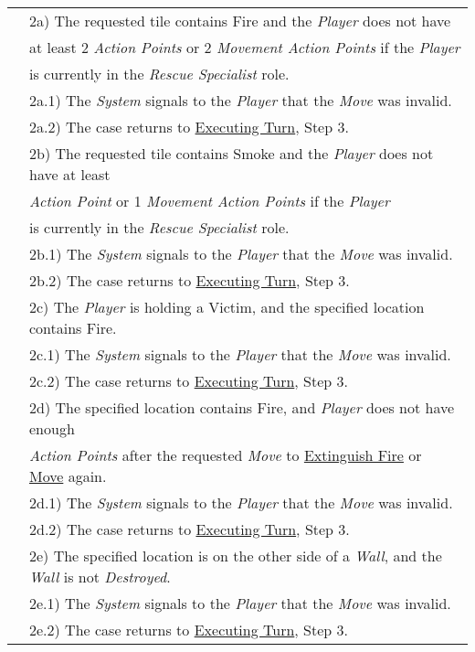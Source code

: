 \documentclass{article}
\begin{document}
	\begin{tabular}{l l}
		&2a) The requested tile contains Fire and the \textit{Player} does not have\\
		&\qquad at least 2 \textit{Action Points} or 2 \textit{Movement Action Points} if the \textit{Player}\\
		&\qquad is currently in the \textit{Rescue Specialist} role.\\
		&\qquad2a.1) The \textit{System} signals to the \textit{Player} that the \textit{Move} was invalid.\\
		&\qquad2a.2) The case returns to \underline{Executing Turn}, Step 3.\\
		&2b) The requested tile contains Smoke and the \textit{Player} does not have at least\\
		&\qquad1 \textit{Action Point} or 1 \textit{Movement Action Points} if the \textit{Player}\\
		&\qquad is currently in the \textit{Rescue Specialist} role.\\
		&\qquad2b.1) The \textit{System} signals to the \textit{Player} that the \textit{Move} was invalid.\\
		&\qquad2b.2) The case returns to \underline{Executing Turn}, Step 3.\\
		&2c) The \textit{Player} is holding a Victim, and the specified location contains Fire.\\
		&\qquad2c.1) The \textit{System} signals to the \textit{Player} that the \textit{Move} was invalid.\\ 
		&\qquad2c.2) The case returns to \underline{Executing Turn}, Step 3.\\
		&2d) The specified location contains Fire, and \textit{Player} does not have enough\\
		&\qquad \textit{Action Points} after the requested \textit{Move} to \underline{Extinguish Fire} or \underline{Move} again.\\
		&\qquad2d.1) The \textit{System} signals to the \textit{Player} that the \textit{Move} was invalid.\\
		&\qquad2d.2) The case returns to \underline{Executing Turn}, Step 3.\\
		&2e) The specified location is on the other side of a \textit{Wall}, and the \textit{Wall} is not \textit{Destroyed}.\\
		&\qquad2e.1) The \textit{System} signals to the \textit{Player} that the \textit{Move} was invalid.\\ 
		&\qquad2e.2) The case returns to \underline{Executing Turn}, Step 3.\\

\end{tabular}
\end{document}
